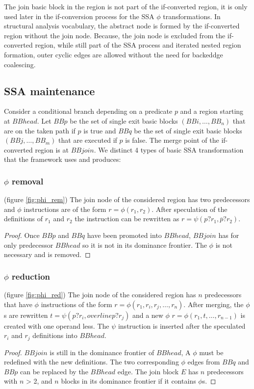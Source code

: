 The join basic block in the region is not part of the if-converted region, it is only used later in the if-conversion process for the SSA $\phi$ transformations. In structural analysis vocabulary, the abstract node is formed by the if-converted region without the join node.
Because, the join node is excluded from the if-converted region, while still part of the SSA process and iterated nested region formation, outer cyclic edges are allowed without the need for backeddge coalescing. 

    \subsection{SSA maintenance}

Consider a conditional branch depending on a predicate $p$ and a region starting at $BBhead$. Let $BBp$ be the set of single exit basic blocks $(BBi,\dots,BB_n)$ that are on the taken path if $p$ is true and $BBq$ be the set of single exit basic blocks $(BBj,\dots,BB_m)$ that are executed if $p$ is false. The merge point of the if-converted region is at $BBjoin$. We distinct 4 types of basic SSA transformation that the framework uses and produces:
\subsubsection{$\phi$ removal} (figure \ref{fig:phi_rem})
The join node of the considered region has two predecessors and $\phi$ instructions are of the form $r=\phi(r_1,r_2)$. After speculation of the definitions of $r_1$ and $r_2$ the instruction can be rewritten as $r=\psi(p?r_1,\overline{p}?r_2)$.
\begin{proof} Once $BBp$ and $BBq$ have been promoted into $BBhead$, $BBjoin$ has for only predecessor $BBhead$ so it is not in its dominance frontier. The $\phi$ is not necessary and is removed.
\end{proof}
\subsubsection{$\phi$ reduction} (figure \ref{fig:phi_red})
 The join node of the considered region has $n$ predecessors that have $\phi$ instructions of the form $r=\phi(r_1,r_i,r_j,\dots,r_n)$. After merging, the $\phi$s are rewritten $t=\psi(p?r_i,overline{p}?r_j)$ and a new $\phi$ $r=\phi(r_1,t,\dots,r_{n-1})$ is created with one operand less. The $\psi$ instruction is inserted after the speculated $r_i$ and $r_j$ definitions into $BBhead$.
\begin{proof} $BBjoin$ is still in the dominance frontier of $BBhead$, A $\phi$ must be redefined with the new definitions. The two corresponding $\phi$ edges from $BBq$ and $BBp$ can be replaced by the $BBhead$ edge.
The join block $E$ has $n$ predecessors with $n$ > 2, and $n$ blocks in its dominance frontier if it contains $\phi$s.
\end{proof}
